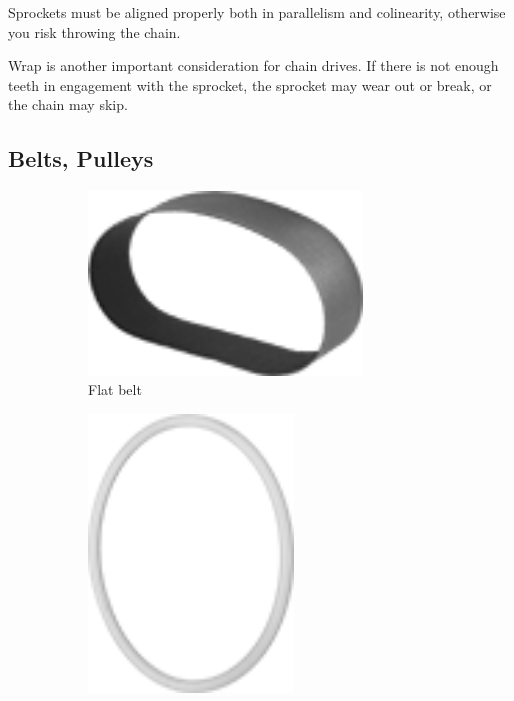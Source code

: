 \documentclass[10pt,letterpaper]{book}
\begin{document}
Sprockets must be aligned properly both in parallelism and colinearity, otherwise you risk throwing the chain.

Wrap is another important consideration for chain drives. If there is not enough teeth in engagement with the sprocket, the sprocket may wear out or break, or the chain may skip. 

\newpage
\subsection{Belts, Pulleys}

\begin{figure}[H]
	\begin{subfigure}[b]{.24\linewidth}
		\includegraphics[width=0.8\textwidth]{imgs/belt_flat.png}
		\caption{Flat belt}
	\end{subfigure}\begin{subfigure}[b]{.24\linewidth}
		\includegraphics[width=0.6\textwidth]{imgs/belt_round.png}

\end{subfigure}
\end{figure}
\end{document}

